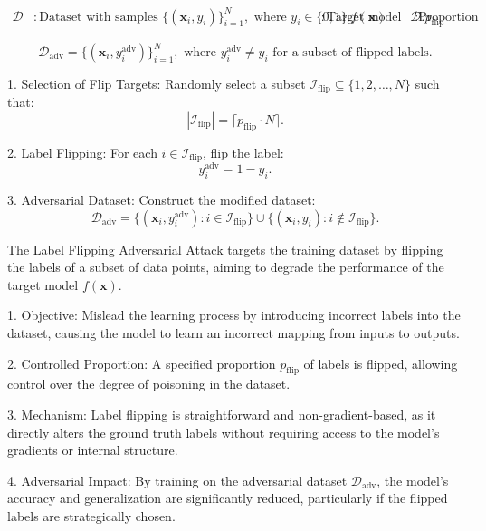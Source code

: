 
\[
\begin{aligned}
\mathcal{D} & : \text{Dataset with samples } \{(\mathbf{x}_i, y_i)\}_{i=1}^N, \text{ where } y_i \in \{0, 1\}.
f(\mathbf{x}) & : \text{Target model to be trained on } \mathcal{D}.
p_{\text{flip}} & : \text{Proportion of labels to be flipped in the dataset.}
\end{aligned}
\]

\[
\mathcal{D}_{\text{adv}} = \{(\mathbf{x}_i, y_i^{\text{adv}})\}_{i=1}^N, \text{ where } y_i^{\text{adv}} \neq y_i \text{ for a subset of flipped labels}.
\]

1. Selection of Flip Targets:  
   Randomly select a subset $\mathcal{I}_{\text{flip}} \subseteq \{1, 2, \ldots, N\}$ such that:
   \[
   |\mathcal{I}_{\text{flip}}| = \lceil p_{\text{flip}} \cdot N \rceil.
   \]

2. Label Flipping:  
   For each $i \in \mathcal{I}_{\text{flip}}$, flip the label:
   \[
   y_i^{\text{adv}} = 1 - y_i.
   \]

3. Adversarial Dataset:  
   Construct the modified dataset:
   \[
   \mathcal{D}_{\text{adv}} = \{(\mathbf{x}_i, y_i^{\text{adv}}) : i \in \mathcal{I}_{\text{flip}}\} \cup \{(\mathbf{x}_i, y_i) : i \notin \mathcal{I}_{\text{flip}}\}.
   \]

The Label Flipping Adversarial Attack targets the training dataset by flipping the labels of a subset of data points, aiming to degrade the performance of the target model $f(\mathbf{x})$. 

1. Objective: Mislead the learning process by introducing incorrect labels into the dataset, causing the model to learn an incorrect mapping from inputs to outputs.

2. Controlled Proportion: A specified proportion $p_{\text{flip}}$ of labels is flipped, allowing control over the degree of poisoning in the dataset.

3. Mechanism: Label flipping is straightforward and non-gradient-based, as it directly alters the ground truth labels without requiring access to the model's gradients or internal structure.

4. Adversarial Impact: By training on the adversarial dataset $\mathcal{D}_{\text{adv}}$, the model's accuracy and generalization are significantly reduced, particularly if the flipped labels are strategically chosen.